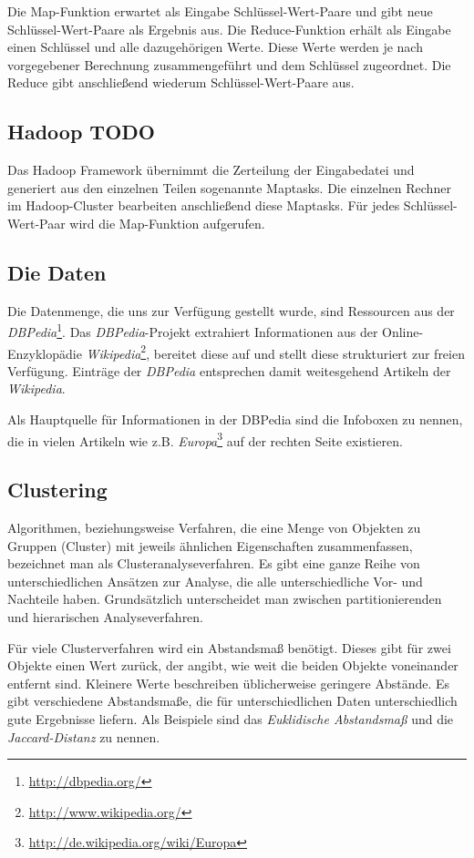 \documentclass[a4paper]{llncs}
\begin{document}
Die Map-Funktion erwartet als Eingabe Schlüssel-Wert-Paare und gibt neue Schlüssel-Wert-Paare als Ergebnis aus.
Die Reduce-Funktion erhält als Eingabe einen Schlüssel und alle dazugehörigen Werte.
Diese Werte werden je nach vorgegebener Berechnung zusammengeführt und dem Schlüssel zugeordnet.
Die Reduce gibt anschließend wiederum Schlüssel-Wert-Paare aus.

\subsection{Hadoop TODO}
Das Hadoop Framework übernimmt die Zerteilung der Eingabedatei und generiert aus den einzelnen Teilen sogenannte Maptasks.
Die einzelnen Rechner im Hadoop-Cluster bearbeiten anschließend diese Maptasks.
Für jedes Schlüssel-Wert-Paar wird die Map-Funktion aufgerufen.

\subsection{Die Daten}
Die Datenmenge, die uns zur Verfügung gestellt wurde, sind Ressourcen aus der \emph{DBPedia}\footnote{\url{http://dbpedia.org/}}.
Das \emph{DBPedia}-Projekt extrahiert Informationen aus der Online-Enzyklopädie \emph{Wikipedia}\footnote{\url{http://www.wikipedia.org/}}, bereitet diese auf und stellt diese strukturiert zur freien Verfügung.
Einträge der \emph{DBPedia} entsprechen damit weitesgehend Artikeln der \emph{Wikipedia}.

Als Hauptquelle für Informationen in der DBPedia sind die Infoboxen zu nennen, die in vielen Artikeln wie z.B. \emph{Europa}\footnote{\url{http://de.wikipedia.org/wiki/Europa}} auf der rechten Seite existieren.

\subsection{Clustering}
Algorithmen, beziehungsweise Verfahren, die eine Menge von Objekten zu Gruppen (Cluster) mit jeweils ähnlichen Eigenschaften zusammenfassen, bezeichnet man als Clusteranalyseverfahren.
Es gibt eine ganze Reihe von unterschiedlichen Ansätzen zur Analyse, die alle unterschiedliche Vor- und Nachteile haben.
Grundsätzlich unterscheidet man zwischen partitionierenden und hierarischen Analyseverfahren.

Für viele Clusterverfahren wird ein Abstandsmaß benötigt. Dieses gibt für zwei Objekte einen Wert zurück, der angibt, wie weit die beiden Objekte voneinander entfernt sind. Kleinere Werte beschreiben üblicherweise geringere Abstände. Es gibt verschiedene Abstandsmaße, die für unterschiedlichen Daten unterschiedlich gute Ergebnisse liefern. Als Beispiele sind das \emph{Euklidische Abstandsmaß} und die \emph{Jaccard-Distanz} zu nennen.
\end{document}
